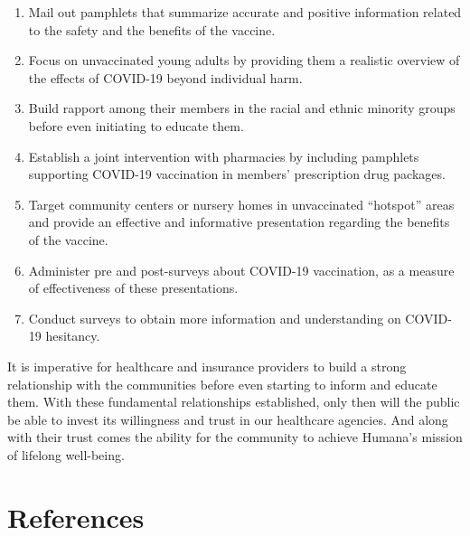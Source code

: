 \documentclass[
  12pt,
]{article}
\begin{document}
\begin{enumerate}
\def\labelenumi{\arabic{enumi}.}
\item
  Mail out pamphlets that summarize accurate and positive information
  related to the safety and the benefits of the vaccine.
\item
  Focus on unvaccinated young adults by providing them a realistic
  overview of the effects of COVID-19 beyond individual harm.
\item
  Build rapport among their members in the racial and ethnic minority
  groups before even initiating to educate them.
\item
  Establish a joint intervention with pharmacies by including pamphlets
  supporting COVID-19 vaccination in members' prescription drug
  packages.
\item
  Target community centers or nursery homes in unvaccinated ``hotspot''
  areas and provide an effective and informative presentation regarding
  the benefits of the vaccine.
\item
  Administer pre and post-surveys about COVID-19 vaccination, as a
  measure of effectiveness of these presentations.
\item
  Conduct surveys to obtain more information and understanding on
  COVID-19 hesitancy.
\end{enumerate}

It is imperative for healthcare and insurance providers to build a
strong relationship with the communities before even starting to inform
and educate them. With these fundamental relationships established, only
then will the public be able to invest its willingness and trust in our
healthcare agencies. And along with their trust comes the ability for
the community to achieve Humana's mission of lifelong well-being.

\newpage

\hypertarget{references}{%
\section*{References}\label{references}}
\end{document}
